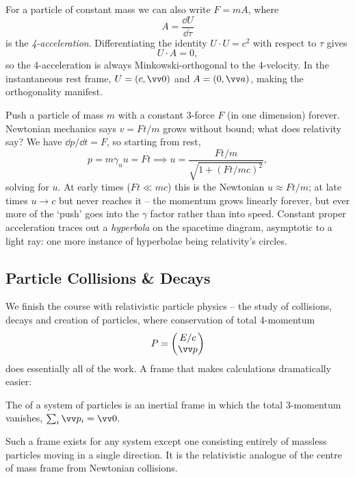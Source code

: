 For a particle of constant mass we can also write $F = mA$, where
$$
A = \frac{\dd U}{\dd\tau}
$$
is the \emph{4-acceleration}. Differentiating the identity $U \cdot U = c^2$ with respect to $\tau$ gives
$$
U \cdot A = 0,
$$
so the 4-acceleration is always Minkowski-orthogonal to the 4-velocity. In the instantaneous rest frame, $U = (c, \vv 0)$ and $A = (0, \vv a)$, making the orthogonality manifest.

\begin{example}
	Push a particle of mass $m$ with a constant 3-force $F$ (in one dimension) forever. Newtonian mechanics says $v = Ft/m$ grows without bound; what does relativity say? We have $\dd p/\dd t = F$, so starting from rest,
	$$
	p = m \gamma_u u = Ft \implies u = \frac{Ft/m}{\sqrt{1 + (Ft/mc)^2}},
	$$
	solving for $u$. At early times ($Ft \ll mc$) this is the Newtonian $u \approx Ft/m$; at late times $u \to c$ but never reaches it -- the momentum grows linearly forever, but ever more of the `push' goes into the $\gamma$ factor rather than into speed. Constant proper acceleration traces out a \emph{hyperbola} on the spacetime diagram, asymptotic to a light ray: one more instance of hyperbolae being relativity's circles.
\end{example}

\subsection{Particle Collisions \& Decays}

We finish the course with relativistic particle physics -- the study of collisions, decays and creation of particles, where conservation of total 4-momentum
$$
P = \begin{pmatrix} E/c \\ \vv p\end{pmatrix}
$$
does essentially all of the work. A frame that makes calculations dramatically easier:

\begin{definition}
	The  of a system of particles is an inertial frame in which the total 3-momentum vanishes, $\sum_i \vv p_i = \vv 0$.
\end{definition}

Such a frame exists for any system except one consisting entirely of massless particles moving in a single direction. It is the relativistic analogue of the centre of mass frame from Newtonian collisions.

